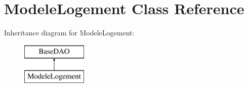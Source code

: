 \hypertarget{class_modele_logement}{}\section{Modele\+Logement Class Reference}
\label{class_modele_logement}
Inheritance diagram for Modele\+Logement\+:\begin{figure}[H]
\begin{center}
\leavevmode
\includegraphics[height=2.000000cm]{class_modele_logement}
\end{center}
\end{figure}
